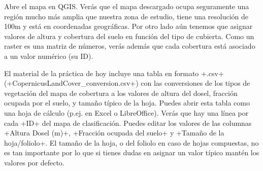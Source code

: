 \documentclass[a4paper,11pt]{article}
\begin{document}
      Abre el mapa en QGIS. Verás que el mapa descargado ocupa seguramente una región mucho más amplia que nuestra zona de estudio, tiene una resolución de 100m y está en coordenadas geográficas. Por otro lado aún tenemos que asignar valores de altura y cobertura del suelo en función del tipo de cubierta. Como un raster es una matriz de números, verás además que cada cobertura está asociado a un valor numérico (su ID). 
      
      El material de la práctica de hoy incluye una tabla en formato \cverb+.csv+ (\cverb+CopernicusLandCover_conversion.csv+) con las conversiones de los tipos de vegetación del mapa de cobertura a los valores de altura del dosel, fracción ocupada por el suelo, y tamaño típico de la hoja. Puedes abrir esta tabla como una hoja de cálculo (p.ej. en Excel o LibreOffice). Verás que hay una línea por cada \cverb+ID+ del mapa de clasificación. Puedes editar los valores de las columnas \cverb+Altura Dosel (m)+, \cverb+Fracción ocupada del suelo+ y \cverb+Tamaño de la hoja/foliolo+. El tamaño de la hoja, o del foliolo en caso de hojas compuestas, no es tan importante por lo que si tienes dudas en asignar un valor típico mantén los valores por defecto. 
      
\end{document}
